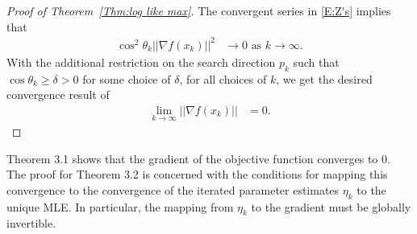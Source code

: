 \begin{proof}[Proof of Theorem~\ref{Thm:log like max}]
The convergent series in \eqref{E:Z's} implies that 
\begin{align*}
	\cos^2 \theta_k || \nabla f(x_k) ||^2 &\to 0 \text{ as } k \to \infty.
\end{align*}
With the additional restriction on the search direction $p_k$ such that $\cos \theta_k 
\geq \delta > 0$ for some choice 
of $\delta$, for all choices of $k$, we get the desired convergence result of
\begin{align*}
	\lim_{k \to \infty} || \nabla f(x_k) || &= 0.
\end{align*}

\end{proof}


Theorem 3.1 shows that the gradient of the objective function converges to 0.  The 
proof for Theorem 3.2 is concerned 
with the conditions for mapping this convergence to the convergence of the iterated 
parameter estimates $\eta_k$ to the 
unique MLE.  In particular, the mapping from $\eta_k$ to the gradient must be globally 
invertible.

